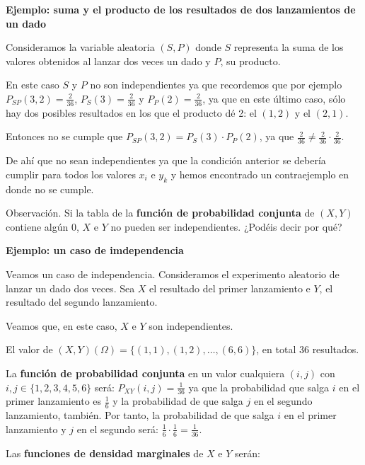 \documentclass[]{book}
\begin{document}
\textbf{Ejemplo: suma y el producto de los resultados de dos lanzamientos de un dado}

Consideramos la variable aleatoria \((S,P)\) donde \(S\) representa la suma de los valores obtenidos al lanzar dos veces un dado y \(P\), su producto.

En este caso \(S\) y \(P\) no son independientes ya que recordemos que por ejemplo \(P_{SP}(3,2)=\frac{2}{36}\), \(P_S(3)=\frac{2}{36}\) y \(P_P(2)=\frac{2}{36}\), ya que en este último caso, sólo hay dos posibles resultados en los que el producto dé 2: el \((1,2)\) y el \((2,1)\).

Entonces no se cumple que \(P_{SP}(3,2)=P_S(3)\cdot P_P(2)\), ya que \(\frac{2}{36}\neq \frac{2}{36}\cdot \frac{2}{36}\).

De ahí que no sean independientes ya que la condición anterior se debería cumplir para todos los valores \(x_i\) e \(y_k\) y hemos encontrado un contraejemplo en donde no se cumple.

Observación.
Si la tabla de la \textbf{función de probabilidad conjunta} de \((X,Y)\) contiene algún \(0\), \(X\) e \(Y\) no pueden ser independientes. ¿Podéis decir por qué?

\textbf{Ejemplo: un caso de imdependencia}

Veamos un caso de independencia. Consideramos el experimento aleatorio de lanzar un dado dos veces. Sea \(X\) el resultado del primer lanzamiento e \(Y\), el resultado del segundo lanzamiento.

Veamos que, en este caso, \(X\) e \(Y\) son independientes.

El valor de \((X,Y)(\Omega)=\{(1,1),(1,2),\ldots,(6,6)\}\), en total 36 resultados.

La \textbf{función de probabilidad conjunta} en un valor cualquiera \((i,j)\) con \(i,j\in\{1,2,3,4,5,6\}\) será:
\(P_{XY}(i,j)=\frac{1}{36}\) ya que la probabilidad que salga \(i\) en el primer lanzamiento es \(\frac{1}{6}\) y la probabilidad de que salga \(j\) en el segundo lanzamiento, también. Por tanto, la probabilidad de que salga \(i\) en el primer lanzamiento y \(j\) en el segundo será: \(\frac{1}{6}\cdot \frac{1}{6}=\frac{1}{36}.\)

Las \textbf{funciones de densidad marginales} de \(X\) e \(Y\) serán:
\end{document}
